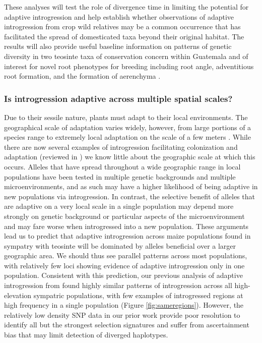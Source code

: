 These analyses will test the role of divergence time in limiting the potential for adaptive introgression and help establish whether observations of adaptive introgression from crop wild relatives may be a common occurrence that has facilitated the spread of domesticated taxa beyond their original habitat.
The results will also provide useful baseline information on patterns of genetic diversity in two teosinte taxa of conservation concern within Guatemala and of interest for novel root phenotypes for breeding including root angle, adventitious root formation, and the formation of aerenchyma \citep{omori2007qtl,mano2007breeding}. 

\subsubsection{Is introgression adaptive across multiple spatial scales?}
\label{sss:scale}

Due to their sessile nature, plants must adapt to their local environments. 
The geographical scale of adaptation varies widely, however, from large portions of a species range \citep{lowry2010, fang2014} to extremely local adaptation on the scale of a few meters \citep{hamrick1979}.  
While there are now several examples of introgression facilitating colonization and adaptation (reviewed in \citealt{Bock2015}) we know little about the geographic scale at which this occurs.
Alleles that have spread throughout a wide geographic range in local populations have been tested in multiple genetic backgrounds and multiple microenvironments, and as such may have a higher likelihood of being adaptive in new populations via introgression.
In contrast, the selective benefit of alleles that are adaptive on a very local scale in a single population may depend more strongly on genetic background or particular aspects of the microenvironment and may fare worse when introgressed into a new population. 
These arguments lead us to predict that adaptive introgression across maize populations found in sympatry with teosinte will be dominated by alleles beneficial over a larger geographic area.
We should thus see parallel patterns across most populations, with relatively few loci showing evidence of adaptive introgression only in one population.
Consistent with this prediction, our previous analysis of adaptive introgression from \zm{} found highly similar patterns of introgression across all high-elevation sympatric populations, with few examples of introgressed regions at high frequency in a single population (Figure \ref{fig:sameregions}).
However, the relatively low density SNP data in our prior work provide poor resolution to identify all but the strongest selection signatures \citep{tiffin2014advances} and suffer from ascertainment bias that may limit detection of diverged haplotypes. 
  
